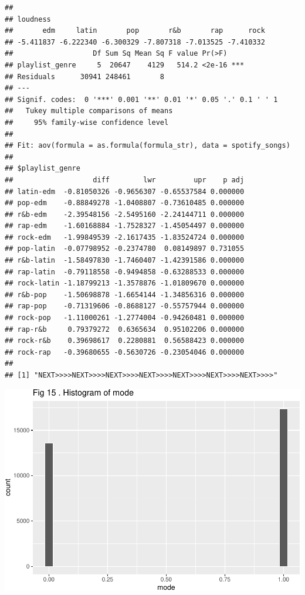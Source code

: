 \documentclass[
]{article}
\begin{document}
\begin{verbatim}
## 
## loudness
##       edm     latin       pop       r&b       rap      rock 
## -5.411837 -6.222340 -6.300329 -7.807318 -7.013525 -7.410332 
##                   Df Sum Sq Mean Sq F value Pr(>F)    
## playlist_genre     5  20647    4129   514.2 <2e-16 ***
## Residuals      30941 248461       8                   
## ---
## Signif. codes:  0 '***' 0.001 '**' 0.01 '*' 0.05 '.' 0.1 ' ' 1
##   Tukey multiple comparisons of means
##     95% family-wise confidence level
## 
## Fit: aov(formula = as.formula(formula_str), data = spotify_songs)
## 
## $playlist_genre
##                   diff        lwr         upr    p adj
## latin-edm  -0.81050326 -0.9656307 -0.65537584 0.000000
## pop-edm    -0.88849278 -1.0408807 -0.73610485 0.000000
## r&b-edm    -2.39548156 -2.5495160 -2.24144711 0.000000
## rap-edm    -1.60168884 -1.7528327 -1.45054497 0.000000
## rock-edm   -1.99849539 -2.1617435 -1.83524724 0.000000
## pop-latin  -0.07798952 -0.2374780  0.08149897 0.731055
## r&b-latin  -1.58497830 -1.7460407 -1.42391586 0.000000
## rap-latin  -0.79118558 -0.9494858 -0.63288533 0.000000
## rock-latin -1.18799213 -1.3578876 -1.01809670 0.000000
## r&b-pop    -1.50698878 -1.6654144 -1.34856316 0.000000
## rap-pop    -0.71319606 -0.8688127 -0.55757944 0.000000
## rock-pop   -1.11000261 -1.2774004 -0.94260481 0.000000
## rap-r&b     0.79379272  0.6365634  0.95102206 0.000000
## rock-r&b    0.39698617  0.2280881  0.56588423 0.000000
## rock-rap   -0.39680655 -0.5630726 -0.23054046 0.000000
## 
## [1] "NEXT>>>>NEXT>>>>NEXT>>>>NEXT>>>>NEXT>>>>NEXT>>>>NEXT>>>>"
\end{verbatim}

\includegraphics{Final-Report_files/figure-latex/unnamed-chunk-14-11.pdf}
\end{document}
